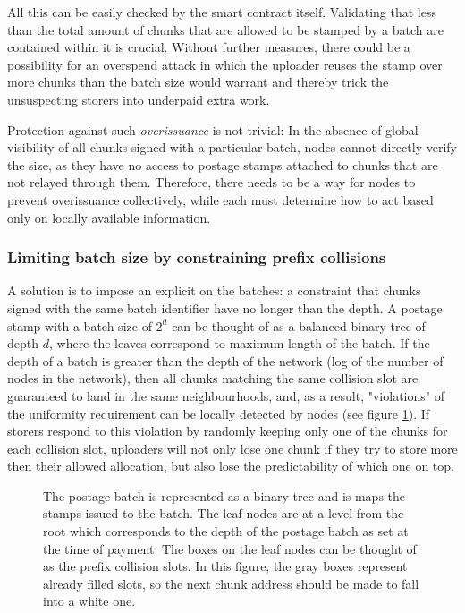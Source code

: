 All this can be easily checked by the smart contract itself. Validating that less than the total amount of chunks that are allowed to be stamped by a batch are contained within it is crucial. Without further measures, there could be a possibility for an overspend attack in which the uploader reuses the stamp over more chunks than the batch size would warrant and thereby trick the unsuspecting storers into underpaid extra work. 

Protection against such \emph{overissuance} is not trivial: In the absence of global visibility of all chunks signed with a particular batch, nodes cannot directly verify the size, as they have no access to postage stamps attached to chunks that are not relayed through them. Therefore, there needs to be a way for nodes to prevent overissuance collectively, while each must determine how to act based only on locally available information.

\subsubsection{Limiting batch size by constraining prefix collisions}

A solution is to impose an explicit  on the batches: a constraint that chunks signed with the same batch identifier have no  longer than the depth. A postage stamp with a batch size of $2^d$ can be thought of as a balanced binary tree of depth $d$, where the leaves correspond to maximum length  of the batch. If the depth of a batch is greater than the depth of the network (log of the number of nodes in the network), then all chunks matching the same collision slot are guaranteed to land in the same neighbourhoods, and, as a result, "violations" of the uniformity requirement can be locally detected by nodes (see figure \ref{fig:prefix-collision}). If storers respond to this violation by randomly keeping only one of the chunks for each collision slot, uploaders will not only lose one chunk if they try to store more then their allowed allocation, but also lose the  predictability of which one on top.

\begin{figure}[htbp]
  \centering
    \caption[Limiting the size of a postage stamp \statusgreen]{The postage batch is represented as a binary tree and is maps the stamps issued to the batch.  The leaf nodes are at a level from the root which corresponds to the depth of the postage batch as set at the time of payment. The boxes on the leaf nodes can be thought of as the prefix collision slots. In this figure, the gray boxes represent already filled slots, so the next chunk address should be made to fall into a white one.}
  \label{fig:prefix-collision}
\end{figure}


